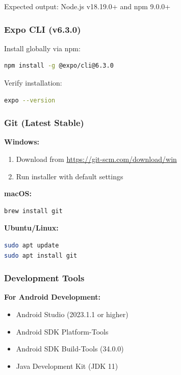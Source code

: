 \documentclass[a4paper,12pt]{article}
\begin{document}
Expected output: Node.js v18.19.0+ and npm 9.0.0+

\subsubsection{Expo CLI (v6.3.0)}

Install globally via npm:

\begin{lstlisting}[language=bash]
npm install -g @expo/cli@6.3.0
\end{lstlisting}

Verify installation:
\begin{lstlisting}[language=bash]
expo --version
\end{lstlisting}

\subsubsection{Git (Latest Stable)}

\textbf{Windows:}
\begin{enumerate}
    \item Download from \href{https://git-scm.com/download/win}{https://git-scm.com/download/win}
    \item Run installer with default settings
\end{enumerate}

\textbf{macOS:}
\begin{lstlisting}[language=bash]
brew install git
\end{lstlisting}

\textbf{Ubuntu/Linux:}
\begin{lstlisting}[language=bash]
sudo apt update
sudo apt install git
\end{lstlisting}

\subsubsection{Development Tools}

\textbf{For Android Development:}
\begin{itemize}
    \item Android Studio (2023.1.1 or higher)
    \item Android SDK Platform-Tools
    \item Android SDK Build-Tools (34.0.0)
    \item Java Development Kit (JDK 11)
\end{itemize}
\end{document}
